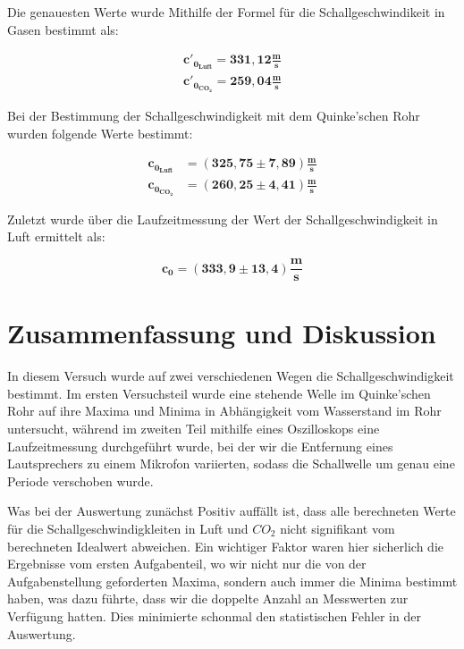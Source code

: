 \documentclass{article}
\begin{document}
Die genauesten Werte wurde Mithilfe der Formel für die Schallgeschwindikeit in Gasen bestimmt als:

\begin{equation}
    \begin{split}
        \bm{c'_{0_{Luft}} = 331,12 \frac{m}{s}} \\
        \bm{c'_{0_{CO_2}} = 259,04 \frac{m}{s}}
    \end{split}
\end{equation}

Bei der Bestimmung der Schallgeschwindigkeit mit dem Quinke'schen Rohr wurden folgende Werte bestimmt:

\begin{equation}
    \begin{split}
        \bm{c_{0_{Luft}}} &= \bm{(325,75 \pm 7,89) \frac{m}{s}} \\
        \bm{c_{0_{CO_2}}} &= \bm{(260,25 \pm 4,41) \frac{m}{s}} 
    \end{split}
\end{equation}

Zuletzt wurde über die Laufzeitmessung der Wert der Schallgeschwindigkeit in Luft ermittelt als:

\begin{equation}
        \bm{c_0 = (333,9 \pm 13,4) \frac{m}{s}}
\end{equation}

\newpage

\section{Zusammenfassung und Diskussion}

In diesem Versuch wurde auf zwei verschiedenen Wegen die Schallgeschwindigkeit bestimmt. Im ersten Versuchsteil wurde eine stehende Welle im Quinke'schen Rohr auf ihre Maxima und Minima in Abhängigkeit vom Wasserstand im Rohr untersucht, während im zweiten Teil mithilfe eines Oszilloskops eine Laufzeitmessung durchgeführt wurde, bei der wir die Entfernung eines Lautsprechers zu einem Mikrofon variierten, sodass die Schallwelle um genau eine Periode verschoben wurde. 

Was bei der Auswertung zunächst Positiv auffällt ist, dass alle berechneten Werte für die Schallgeschwindigkleiten in Luft und $CO_2$ nicht signifikant vom berechneten Idealwert abweichen. Ein wichtiger Faktor waren hier sicherlich die Ergebnisse vom ersten Aufgabenteil, wo wir nicht nur die von der Aufgabenstellung geforderten Maxima, sondern auch immer die Minima bestimmt haben, was dazu führte, dass wir die doppelte Anzahl an Messwerten zur Verfügung hatten. Dies minimierte schonmal den statistischen Fehler in der Auswertung. 
\end{document}
